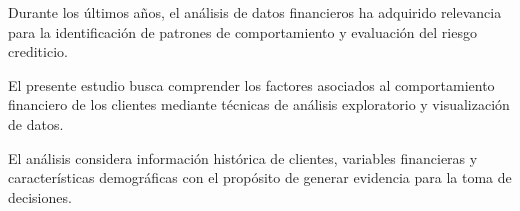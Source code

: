 

Durante los últimos años, el análisis de datos financieros
ha adquirido relevancia para la identificación de patrones
de comportamiento y evaluación del riesgo crediticio.


El presente estudio busca comprender los factores asociados
al comportamiento financiero de los clientes mediante técnicas
de análisis exploratorio y visualización de datos.


El análisis considera información histórica de clientes,
variables financieras y características demográficas con
el propósito de generar evidencia para la toma de decisiones.